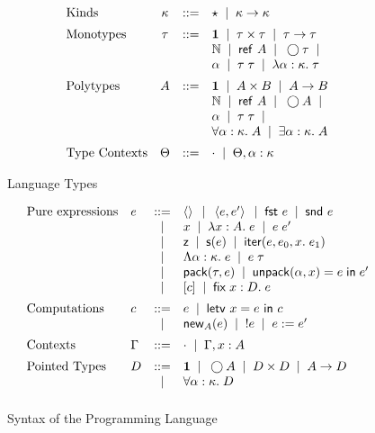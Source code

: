 \documentclass[preprint,natbib]{sigplanconf}
\begin{document}
\begin{figure}
{\small
\begin{displaymath}
  \begin{array}{lcll}
    \mbox{Kinds} & 
      \kappa & ::= & \star \;\;|\;\; \kappa \to \kappa 
    \\[0.5em]
     \mbox{Monotypes} & 
      \tau & ::= & 
         \mathbf{1} \;\;|\;\; 
         \tau \times \tau \;\;|\;\; 
         \tau \to \tau \\
     &&& \mathbb{N} \;\;|\;\; 
         \mbox{\textsf{{ref }}}A \;\;|\;\;
         \bigcirc{\tau} \;\;|\;\; \\
     &&& \alpha \;\;|\;\;
         \tau\;\tau \;\;|\;\; 
         \lambda \alpha:\kappa.\;\tau 
    \\[0.5em]
    \mbox{Polytypes} & 
      A & ::= & 
         \mathbf{1} \;\;|\;\; 
         A \times B \;\;|\;\; 
         A \to B \\
    &&&  \mathbb{N} \;\;|\;\; 
         \mbox{\textsf{{ref }}}A \;\;|\;\;
         \bigcirc{A} \;\;|\;\; \\
    &&&  \alpha \;\;|\;\;
         \tau\;\tau \;\;|\;\; \\
    &&&  \forall \alpha:\kappa.\; A \;\;|\;\; 
         \exists \alpha:\kappa.\; A \\[0.5em]
    \mbox{Type Contexts} & 
      \Theta & ::= & \cdot \;\;|\;\; \Theta, \alpha:\kappa \\
  \end{array}
\end{displaymath}
}
\caption{Language Types}
\label{type-syntax}
\end{figure}


\begin{figure}
{\small
\begin{displaymath}
  \begin{array}{llcl}
    \mbox{Pure expressions} & 
     e & ::= & 
         \left<\right> \;\;|\;\;
         \left<{e},{e'}\right> \;\;|\;\;
         \mbox{\textsf{{fst }}} e \;\;|\;\;
         \mbox{\textsf{{snd }}} e 
\\
     &&|& x \;\;|\;\; \lambda x:A.\;e \;\;|\;\; e\;e' 
\\ 
     &&|& \mbox{\textsf{{z}}} \;\;|\;\; 
          \mbox{\textsf{{s}}}(e) \;\;|\;\; 
          \mbox{\textsf{{iter}}}(e, {e_0}, {x}.\; {e_1})
\\ 
     &&|& \Lambda \alpha:\kappa.\;e \;\;|\;\; e\;\tau 
\\ 
     &&|& \mbox{\textsf{{pack}}}({\tau}, {e}) \;\;|\;\; \mbox{\textsf{{unpack}}}({\alpha}, {x}) = {e} \;\mbox{\textsf{{in}}}\;{e'} 
\\
     &&|& [c] \;\;|\;\; \mbox{\textsf{{fix}}}\;{x:D}.\;{e}
\\[0.5em]
  \mbox{Computations} & 
    c & ::= & e \;\;|\;\; \mbox{\textsf{{letv }}}x = e\mbox{\textsf{{ in }}}c \\
   &  &  |  & \mbox{\textsf{{new}}}_{A}(e) \;\;|\;\; !e \;\;|\;\; e := e'
\\[0.5em]
  \mbox{Contexts} & 
    \Gamma & ::= & \cdot \;\;|\;\; \Gamma, x:A 
\\[0.5em]
  \mbox{Pointed Types} & 
     D & ::= & \mathbf{1} \;\;|\;\; \bigcirc{A} \;\;|\;\; D \times D \;\;|\;\; A \to D  \\
    &  &  |  & \forall \alpha:\kappa.\; D 
\\[0.5em] 
  \end{array}
\end{displaymath}
}
\caption{Syntax of the Programming Language}
\label{lang-syntax}
\end{figure}
\end{document}
